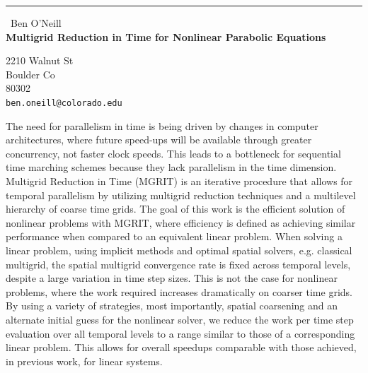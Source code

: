 \documentclass{report}
\begin{document}
\begin{center}
\rule{6in}{1pt} \
{\large Ben O'Neill \\
{\bf Multigrid Reduction in Time for Nonlinear Parabolic Equations }}

2210 Walnut St \\ Boulder Co \\ 80302
\\
{\tt ben.oneill@colorado.edu}\end{center}

The need for parallelism in time is being driven by changes in computer
architectures, where future speed-ups will be available through greater
concurrency, not faster clock speeds. This leads to a bottleneck for
sequential time marching schemes because they lack parallelism in the
time dimension. Multigrid Reduction in Time (MGRIT) is an iterative
procedure that allows for temporal parallelism by utilizing multigrid
reduction techniques and a multilevel hierarchy of coarse time grids. The
goal of this work is the efficient solution of nonlinear problems with
MGRIT, where efficiency is defined as achieving similar performance when
compared to an equivalent linear problem. When solving a linear problem,
using implicit methods and optimal spatial solvers, e.g. classical
multigrid, the spatial multigrid convergence rate is fixed across
temporal levels, despite a large variation in time step sizes. This is
not the case for nonlinear problems, where the work required increases
dramatically on coarser time grids. By using a variety of strategies,
most importantly, spatial coarsening and an alternate initial guess for
the nonlinear solver, we reduce the work per time step evaluation over
all temporal levels to a range similar to those of a corresponding linear
problem. This allows for overall speedups comparable with those achieved,
in previous work, for linear systems.
\end{document}
